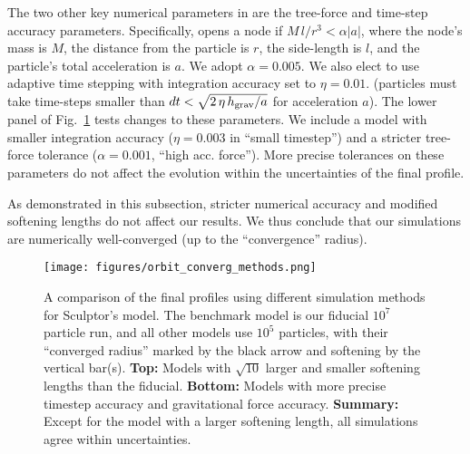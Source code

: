 The two other key numerical parameters in \gadget{} are the tree-force
and time-step accuracy parameters. Specifically, \gadget{} opens a node
if \(M\,l/r^3 < \alpha |a|\), where the node's mass is \(M\), the
distance from the particle is \(r\), the side-length is \(l\), and the
particle's total acceleration is \(a\). We adopt \(\alpha =0.005\). We
also elect to use adaptive time stepping with integration accuracy set
to \(\eta=0.01\). (particles must take time-steps smaller than
\(dt < \sqrt{2\,\eta\,h_{\rm grav} / a}\) for acceleration \(a\)). The
lower panel of Fig.~\ref{fig:methods_convergence} tests changes to these
parameters. We include a model with smaller integration accuracy
(\(\eta=0.003\) in ``small timestep'') and a stricter tree-force
tolerance (\(\alpha=0.001\), ``high acc. force''). More precise
tolerances on these parameters do not affect the evolution within the
uncertainties of the final profile.

As demonstrated in this subsection, stricter numerical accuracy and
modified softening lengths do not affect our results. We thus conclude
that our simulations are numerically well-converged (up to the
``convergence'' radius).

\begin{figure}
\centering
\texttt{[image: figures/orbit\_converg\_methods.png]}
\caption[Isolation method convergence]{A comparison of the final
profiles using different simulation methods for Sculptor's \smallperi{}
model. The benchmark model is our fiducial \(10^7\) particle run, and
all other models use \(10^5\) particles, with their ``converged radius''
marked by the black arrow and softening by the vertical bar(s).
\textbf{Top:} Models with \(\sqrt{10}\) larger and smaller softening
lengths than the fiducial. \textbf{Bottom:} Models with more precise
timestep accuracy and gravitational force accuracy. \textbf{Summary:}
Except for the model with a larger softening length, all simulations
agree within uncertainties.}\label{fig:methods_convergence}
\end{figure}
